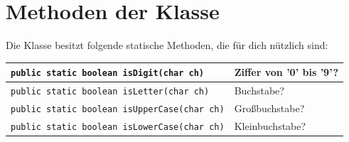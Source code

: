 \section{Methoden der Klasse }

Die Klasse  besitzt folgende statische Methoden, die für
dich nützlich sind:

\medskip
\bgroup
\def\arraystretch{1.2}
\begin{tabularx}{\textwidth}{|p{85mm}|X|}
\hline
\texttt{public static boolean isDigit(char ch)} & 
Ziffer von '0' bis '9'?
\\ \hline
\texttt{public static boolean isLetter(char ch)} & 
Buchstabe?
\\ \hline
\texttt{public static boolean isUpperCase(char ch)} & 
Großbuchstabe?
\\ \hline
\texttt{public static boolean isLowerCase(char ch)} & 
Kleinbuchstabe?
\\ \hline
\end{tabularx}
\egroup
